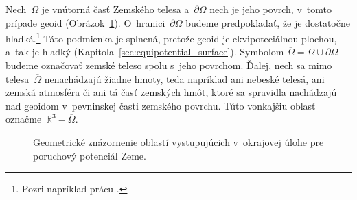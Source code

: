 \documentclass[a4paper, 12pt]{book}
\begin{document}
Nech~$\Omega$ je vnútorná časť Zemského telesa a~$\partial \Omega$ nech je jeho 
povrch, v~tomto prípade geoid (Obrázok~\ref{fig:boundary_value_problems}).  
O~hranici~$\partial \Omega$ budeme predpokladať, že je dostatočne 
hladká.\footnote{Pozri napríklad prácu \textcite{SansoGeoidDetermination}.}  
Táto podmienka je splnená, pretože geoid je ekvipoteciálnou plochou, a~tak je 
hladký (Kapitola~\ref{sec:equipotential_surface}).  Symbolom $\overline{\Omega} 
= \Omega \cup \partial\Omega$ budeme označovať zemské teleso spolu s~jeho 
povrchom.  Ďalej, nech sa mimo telesa~$\overline{\Omega}$ nenachádzajú žiadne 
hmoty, teda napríklad ani nebeské telesá, ani zemská atmosféra či ani tá časť 
zemských hmôt, ktoré sa spravidla nachádzajú nad geoidom v~pevninskej časti 
zemského povrchu.  Túto vonkajšiu oblasť označme~$\mathbb{R}^3 
- \overline{\Omega}$.

\begin{figure}[bt]
\centering

\caption{Geometrické znázornenie oblastí vystupujúcich v~okrajovej úlohe pre 
poruchový potenciál Zeme.}
\label{fig:boundary_value_problems}
\end{figure}
\end{document}
